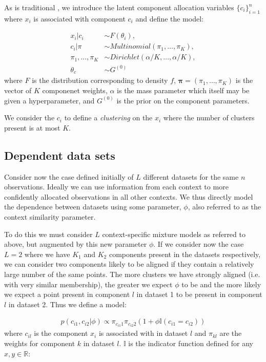\documentclass[fleqn,11pt]{wlscirep}
\begin{document}
As is traditional \cite{tevyeTradition1905}, we introduce the latent component allocation variables $\{c_i\}_{i=1}^n$ where $x_i$ is associated with component $c_i$ and define the model:

\begin{align}
x_i | c_i & \sim F(\theta_i), \\
c_i | \pi & \sim Multinomial(\pi_1,\ldots, \pi_K), \\
\pi_1, \ldots, \pi_K & \sim Dirichlet(\alpha/K, \ldots, \alpha/K), \\
\theta_c & \sim G^{(0)}
\end{align}
where $F$ is the distribution corresponding to density $f$, $\bm{\pi} = (\pi_1, \ldots, \pi_K)$ is the vector of $K$ componenet weights, $\alpha$ is the mass parameter which itself may be given a hyperparameter, and $G^{(0)}$ is the prior on the component parameters.

We consider the $c_i$ to define a \emph{clustering} on the $x_i$ where the number of clusters present is at most $K$.

\subsection{Dependent data sets}
Consider now the case defined initially of $L$ different datasets for the same $n$ observations. Ideally we can use information from each context to more confidently allocated observations in all other contexts. We thus directly model the dependence between datasets using some parameter, $\phi$, also referred to as the context similarity parameter.

To do this we must consider $L$ context-specific mixture models as referred to above, but augmented by this new parameter $\phi$. If we consider now the case $L = 2$ where we have $K_1$ and $K_2$ components present in the datasets respectively, we can consider two components likely to be aligned if they contain a relatively large number of the same points. The more clusters we have strongly aligned (i.e. with very similar membership), the greater we expect $\phi$ to be and the more likely we expect a point present in component $l$ in dataset 1 to be present in component $l$ in dataset 2. Thus we define a model:

\begin{align}
p(c_{i1}, c_{i2}| \phi) \propto \pi_{c_{i1}1} \pi_{c_{i2}2} (1 + \phi \mathbb{I}(c_{i1} = c_{i2}))
\end{align}
where $c_{il}$ is the component $x_i$ is associated with in dataset $l$ and $\pi_{kl}$ are the weights for component $k$ in dataset $l$. $\mathbb{I}$ is the indicator function defined for any $x,y \in \mathbb{R}$:
\end{document}
